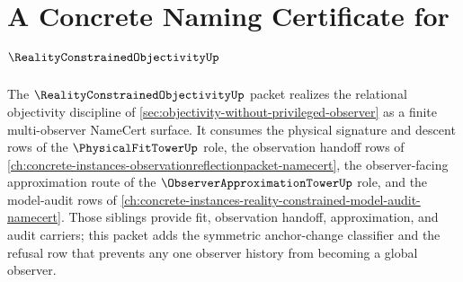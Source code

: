 \chapter{A Concrete Naming Certificate for $\RealityConstrainedObjectivityUp$}
\label{ch:concrete-instances-reality-constrained-objectivity-namecert}

The $\RealityConstrainedObjectivityUp$ packet realizes the relational objectivity discipline of \autoref{sec:objectivity-without-privileged-observer} as a finite multi-observer NameCert surface. It consumes the physical signature and descent rows of the $\PhysicalFitTowerUp$ role, the observation handoff rows of \autoref{ch:concrete-instances-observationreflectionpacket-namecert}, the observer-facing approximation route of the $\ObserverApproximationTowerUp$ role, and the model-audit rows of \autoref{ch:concrete-instances-reality-constrained-model-audit-namecert}. Those siblings provide fit, observation handoff, approximation, and audit carriers; this packet adds the symmetric anchor-change classifier and the refusal row that prevents any one observer history from becoming a global observer.

